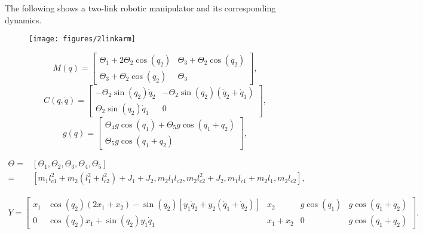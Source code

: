 \documentclass[a4paper,11pt]{article}
\begin{document}
\begin{enumerate}
The following shows a two-link robotic manipulator and its corresponding dynamics.
   \begin{figure}[bh]
      \centering
      \texttt{[image: figures/2linkarm]}
   \end{figure}

\begin{equation}\nonumber
   M(q)=\left[
\begin{array}{cc}
               \Theta_{1}+2\Theta_{2}\cos(q_{2}) &  \Theta_{3}+\Theta_{2}\cos(q_{2})\\
               \Theta_{3}+\Theta_{2}\cos(q_{2})  &  \Theta_{3}
             \end{array}
              \right],
\end{equation}
\begin{equation}\nonumber
    C(q, \dot q)=\left[
\begin{array}{cc}
               -\Theta_{2}\sin(q_{2})\dot q_{2} &  -\Theta_{2}\sin(q_{2})(\dot q_{2}+\dot q_{1})\\
               \Theta_{2}\sin(q_{2})\dot q_{1}  &  0
             \end{array}
              \right],
\end{equation}
\begin{equation}\nonumber
    g(q)=\left[
\begin{array}{c}
               \Theta_{4}g\cos(q_{1})+\Theta_{5}g\cos(q_{1}+q_{2})\\
               \Theta_{5}g\cos(q_{1}+q_{2})
             \end{array}
              \right],
\end{equation}

\begin{align*}
\Theta=&[\Theta_{1}, \Theta_{2}, \Theta_{3},\Theta_{4},
\Theta_{5}] \\
=&[m_1l_{c1}^2\!\!+\!\!m_2(l_1^2\!\!+\!\!l_{c2}^2)\!\!+\!\!J_1\!\!+\!\!J_2, m_2l_1l_{c2},
m_2l_{c2}^2\!\!+\!\!J_2, m_1l_{c1}\!\!+\!\!m_2l_1, m_2l_{c2}],
\end{align*}

\begin{align*}
Y\!\!=\!\!\!\left[\begin{array}{ccccc}
                \!\!x_{1} & \!\!\!\cos (q_{2})\!(2x_{1}\!+\!x_{2})\!\!-\!\!\sin(q_{2})[y_{1}\!\dot q_{2}\!+\!y_{2}\!(\dot q_{1}\!+\!\dot q_{2})]&\!\!x_{2}&\!\!\!g\!\cos(q_{1})&\!\!\!g\!\cos(q_{1}\!+\!q_{2}) \\
                \!\! 0 & \!\!\cos (q_{2})x_{1}+\sin(q_{2})y_{1}\dot q_{1}& x_{1}\!\!+\!x_{2}&0&\!\!\!g\!\cos(q_{1}\!+\!q_{2})
             \end{array}
              \right].\nonumber
\end{align*}



\end{enumerate}
\end{document}
